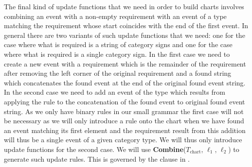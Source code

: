 The final kind of update functions that we need in order to build charts
involves combining an event with a non-empty requirement with an event
of a type matching the requirement whose start coincides with the end
of the first event.  In general there are two variants of such update
functions that we need: one for the case where what is required is a
string of category signs and one for the case where what is required
is a single category sign.  In the first case we need to create a new
event with a requirement which is the remainder of the requirement
after removing the left corner of the original requirement and a found
string which concatenates the found event at the end of the original
found event string.  In the second case we need to add an event of the type
which results from applying the rule to the concatenation of the found
event to
original found event string. As we only have binary rules in our small
grammar the first case will not be necessary as we will only introduce
a rule onto the chart when we have found an event matching its first
element and the requirement result from this addition will thus be a
single event of a given category type.  We will thus only introduce
update functions for the second case.  We will use
\textbf{Combine}($T_{\mathrm{chart}}$, $\ell_1$, $\ell_2$) to generate
such update rules.  This is governed by the clause in \nexteg{}.
